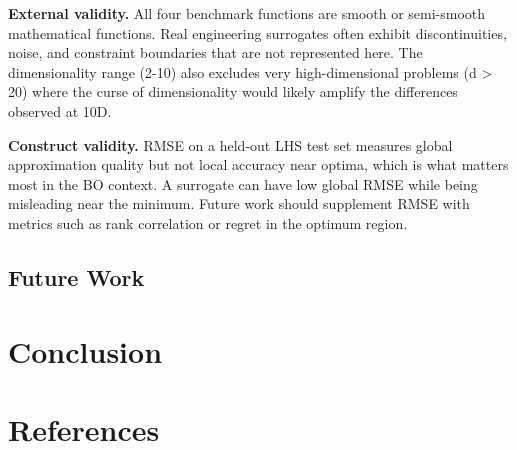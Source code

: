 \documentclass[sigconf,nonacm]{acmart}
\begin{document}
\textbf{External validity.}  All four benchmark functions are smooth or semi-smooth mathematical functions. Real engineering surrogates often exhibit discontinuities, noise, and constraint boundaries that are not represented here. The dimensionality range (2-10) also excludes very high-dimensional problems (d > 20) where the curse of dimensionality would likely amplify the differences observed at 10D.

\textbf{Construct validity.}  RMSE on a held-out LHS test set measures global approximation quality but not local accuracy near optima, which is what matters most in the BO context. A surrogate can have low global RMSE while being misleading near the minimum. Future work should supplement RMSE with metrics such as rank correlation or regret in the optimum region.

\subsection{Future Work}



\section{Conclusion}



%
%

\section*{References}
\end{document}
